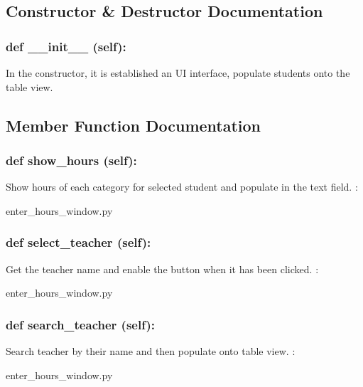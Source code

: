 \subsection{Constructor \& Destructor Documentation}
\hypertarget{class_poly_aa3def076b74bed67904976ad4f9fe9b1}{
\subsubsection[{def __init__ (self):}]{\setlength{\rightskip}{0pt plus 5cm}def {\_\_init\_\_} (self): 
}}
In the constructor, it is established an UI interface, populate students onto the table view.
 

\subsection{Member Function Documentation}
\hypertarget{class_poly_a14a7ad77ce612b0c54f531d307ee4b39}{
\subsubsection[{def show_hours (self):}]{\setlength{\rightskip}{0pt plus 5cm}def {show\_hours} (self):}}\label{class_poly_a14a7ad77ce612b0c54f531d307ee4b39}
Show hours of each category for selected student and populate in the text field.
:\begin{DoxyCompactItemize}
\item 
enter\_hours\_window.\-py\end{DoxyCompactItemize}

\hypertarget{class_poly_a14a7ad77ce612b0c54f531d307ee4b39}{
\subsubsection[{def select_teacher (self):}]{\setlength{\rightskip}{0pt plus 5cm}def {select\_teacher} (self):}}\label{class_poly_a14a7ad77ce612b0c54f531d307ee4b39}
Get the teacher name and enable the button when it has been clicked.
:\begin{DoxyCompactItemize}
\item 
enter\_hours\_window.\-py\end{DoxyCompactItemize}

\hypertarget{class_poly_a14a7ad77ce612b0c54f531d307ee4b39}{
\subsubsection[{def search_teacher (self):}]{\setlength{\rightskip}{0pt plus 5cm}def {search\_teacher} (self):}}\label{class_poly_a14a7ad77ce612b0c54f531d307ee4b39}
Search teacher by their name and then populate onto table view. 
:\begin{DoxyCompactItemize}
\item 
enter\_hours\_window.\-py\end{DoxyCompactItemize}

